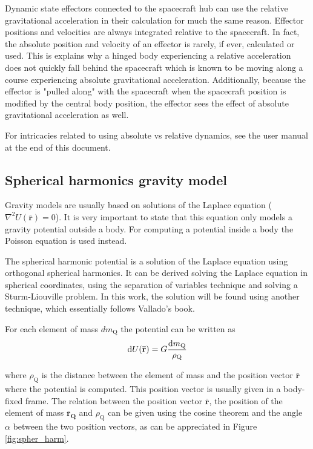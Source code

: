 Dynamic state effectors connected to the spacecraft hub can use the relative gravitational acceleration in their calculation for much the same reason. Effector positions and velocities are always integrated relative to the spacecraft. In fact, the absolute position and velocity of an effector is rarely, if ever, calculated or used. This is explains why a hinged body experiencing a relative acceleration does not quickly fall behind the spacecraft which is known to be moving along a course experiencing absolute gravitational acceleration. Additionally, because the effector is "pulled along" with the spacecraft when the spacecraft position is modified by the central body position, the effector sees the effect of absolute gravitational acceleration as well.

For intricacies related to using absolute vs relative dynamics, see the user manual at the end of this document.

\subsection{Spherical harmonics gravity model}

Gravity models are usually based on solutions of the Laplace equation ($\nabla^2 U(\mathbf{\bar r}) = 0$). It is very important to state that this equation only models a gravity potential outside a body. For computing a potential inside a body the Poisson equation is used instead.

The spherical harmonic potential is a solution of the Laplace equation using orthogonal spherical harmonics. It can be derived solving the Laplace equation in spherical coordinates, using the separation of variables technique and solving a Sturm-Liouville problem. In this work, the solution will be found using another technique, which essentially follows Vallado's book\cite{vallado2013}.

For each element of mass $d m_\text{Q}$ the potential can be written as
\begin{equation}
\textrm{d} U(\mathbf{\bar r}) = G \frac{\textrm{d} m_\text{Q}}{\rho_\text{Q}}
\end{equation}

where $\rho_\text{Q}$ is the distance between the element of mass and the position vector $\mathbf{\bar r}$ where the potential is computed. This position vector is usually given in a body-fixed frame. The relation between the position vector $\mathbf{\bar r}$, the position of the element of mass $\mathbf{\bar r_\text{Q}}$ and $\rho_\text{Q}$ can be given using the cosine theorem and the angle $\alpha$ between the two position vectors, as can be appreciated in Figure \ref{fig:spher_harm}.


